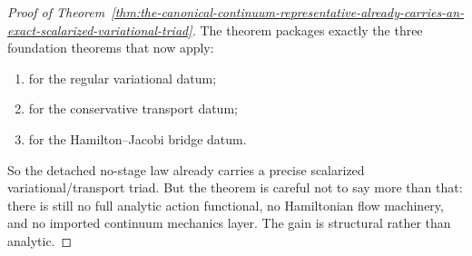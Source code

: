 \begin{proof}[Proof of Theorem~\ref{thm:the-canonical-continuum-representative-already-carries-an-exact-scalarized-variational-triad}]
The theorem
packages exactly the three foundation theorems that now apply:
\begin{enumerate}
\item {} for the regular variational datum;
\item {} for the conservative transport datum;
\item {} for the Hamilton--Jacobi bridge datum.
\end{enumerate}
So the detached no-stage law already carries a precise scalarized
variational/transport triad. But the theorem is careful not to say more than
that: there is still no full analytic action functional, no Hamiltonian flow
machinery, and no imported continuum mechanics layer. The gain is structural
rather than analytic.
\end{proof}

